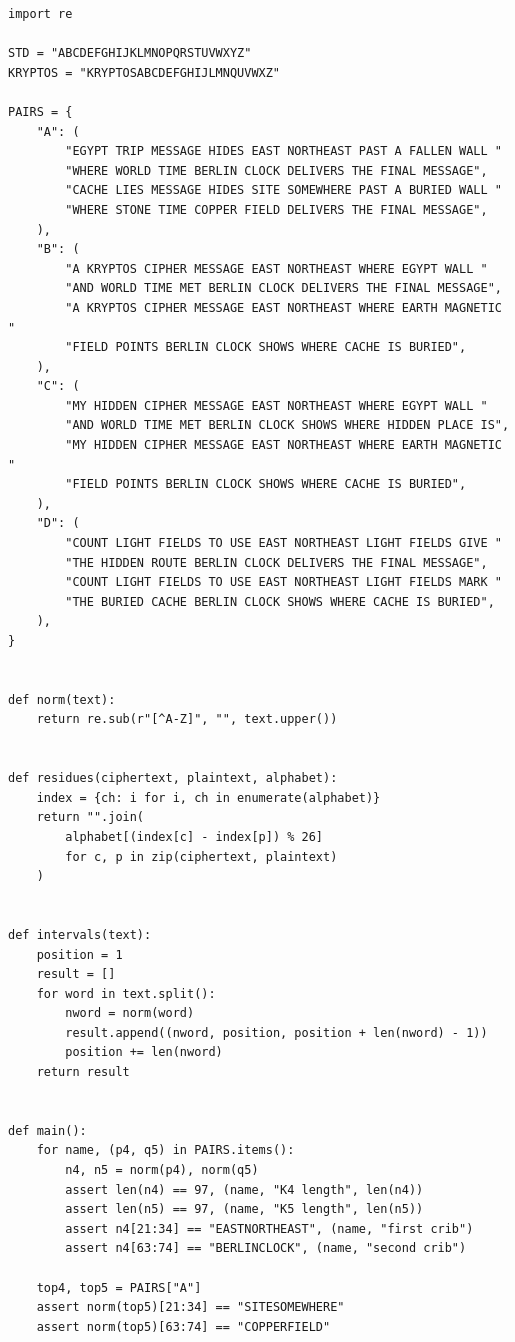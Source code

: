 \documentclass[12pt]{paperFormatting}
\begin{document}
\begin{thesisbody}
\begin{theappendices}
\begin{lstlisting}[style=paperPython,caption={Python audit for Appendix A reproducibility checks.},label={code:appendixAuditScript}]
import re

STD = "ABCDEFGHIJKLMNOPQRSTUVWXYZ"
KRYPTOS = "KRYPTOSABCDEFGHIJLMNQUVWXZ"

PAIRS = {
    "A": (
        "EGYPT TRIP MESSAGE HIDES EAST NORTHEAST PAST A FALLEN WALL "
        "WHERE WORLD TIME BERLIN CLOCK DELIVERS THE FINAL MESSAGE",
        "CACHE LIES MESSAGE HIDES SITE SOMEWHERE PAST A BURIED WALL "
        "WHERE STONE TIME COPPER FIELD DELIVERS THE FINAL MESSAGE",
    ),
    "B": (
        "A KRYPTOS CIPHER MESSAGE EAST NORTHEAST WHERE EGYPT WALL "
        "AND WORLD TIME MET BERLIN CLOCK DELIVERS THE FINAL MESSAGE",
        "A KRYPTOS CIPHER MESSAGE EAST NORTHEAST WHERE EARTH MAGNETIC "
        "FIELD POINTS BERLIN CLOCK SHOWS WHERE CACHE IS BURIED",
    ),
    "C": (
        "MY HIDDEN CIPHER MESSAGE EAST NORTHEAST WHERE EGYPT WALL "
        "AND WORLD TIME MET BERLIN CLOCK SHOWS WHERE HIDDEN PLACE IS",
        "MY HIDDEN CIPHER MESSAGE EAST NORTHEAST WHERE EARTH MAGNETIC "
        "FIELD POINTS BERLIN CLOCK SHOWS WHERE CACHE IS BURIED",
    ),
    "D": (
        "COUNT LIGHT FIELDS TO USE EAST NORTHEAST LIGHT FIELDS GIVE "
        "THE HIDDEN ROUTE BERLIN CLOCK DELIVERS THE FINAL MESSAGE",
        "COUNT LIGHT FIELDS TO USE EAST NORTHEAST LIGHT FIELDS MARK "
        "THE BURIED CACHE BERLIN CLOCK SHOWS WHERE CACHE IS BURIED",
    ),
}


def norm(text):
    return re.sub(r"[^A-Z]", "", text.upper())


def residues(ciphertext, plaintext, alphabet):
    index = {ch: i for i, ch in enumerate(alphabet)}
    return "".join(
        alphabet[(index[c] - index[p]) % 26]
        for c, p in zip(ciphertext, plaintext)
    )


def intervals(text):
    position = 1
    result = []
    for word in text.split():
        nword = norm(word)
        result.append((nword, position, position + len(nword) - 1))
        position += len(nword)
    return result


def main():
    for name, (p4, q5) in PAIRS.items():
        n4, n5 = norm(p4), norm(q5)
        assert len(n4) == 97, (name, "K4 length", len(n4))
        assert len(n5) == 97, (name, "K5 length", len(n5))
        assert n4[21:34] == "EASTNORTHEAST", (name, "first crib")
        assert n4[63:74] == "BERLINCLOCK", (name, "second crib")

    top4, top5 = PAIRS["A"]
    assert norm(top5)[21:34] == "SITESOMEWHERE"
    assert norm(top5)[63:74] == "COPPERFIELD"


\end{lstlisting}
\end{theappendices}
\end{thesisbody}
\end{document}
